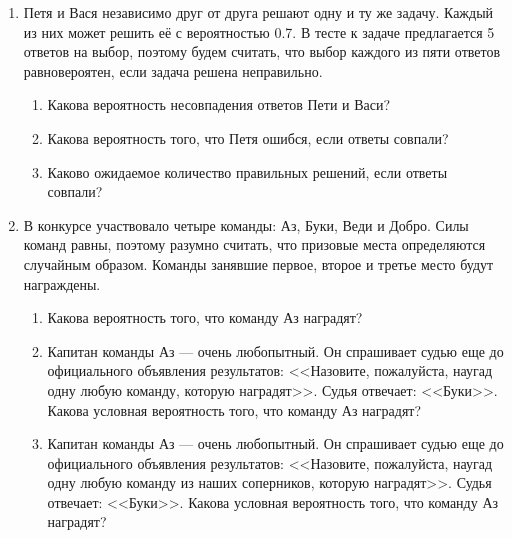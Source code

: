 \documentclass[pdftex,12pt,a4paper]{article}
\begin{document}
\begin{enumerate}
\item Петя и Вася независимо друг от друга решают одну и ту же задачу. Каждый из них может решить её с вероятностью 0.7. В тесте к задаче предлагается 5 ответов на выбор, поэтому будем считать, что выбор каждого из пяти ответов равновероятен, если задача решена неправильно.
\begin{enumerate}
\item Какова вероятность несовпадения ответов Пети и Васи?
\item  Какова вероятность того, что Петя ошибся, если ответы совпали?
\item  Каково ожидаемое количество правильных решений, если ответы совпали?
\end{enumerate}

\item В конкурсе участвовало четыре команды: Аз, Буки, Веди и Добро. Силы команд равны, поэтому разумно считать, что призовые места определяются случайным образом. Команды занявшие первое, второе и третье место будут награждены. 
\begin{enumerate}
\item Какова вероятность того, что команду Аз наградят?
\item Капитан команды Аз --- очень любопытный. Он спрашивает судью еще до официального объявления результатов: <<Назовите, пожалуйста, наугад одну любую команду, которую наградят>>. Судья отвечает: <<Буки>>. Какова условная вероятность того, что команду Аз наградят?
\item Капитан команды Аз --- очень любопытный. Он спрашивает судью еще до официального объявления результатов: <<Назовите, пожалуйста, наугад одну любую команду из наших соперников, которую наградят>>. Судья отвечает: <<Буки>>. Какова условная вероятность того, что команду Аз наградят?
\end{enumerate}


\end{enumerate}
\end{document}

